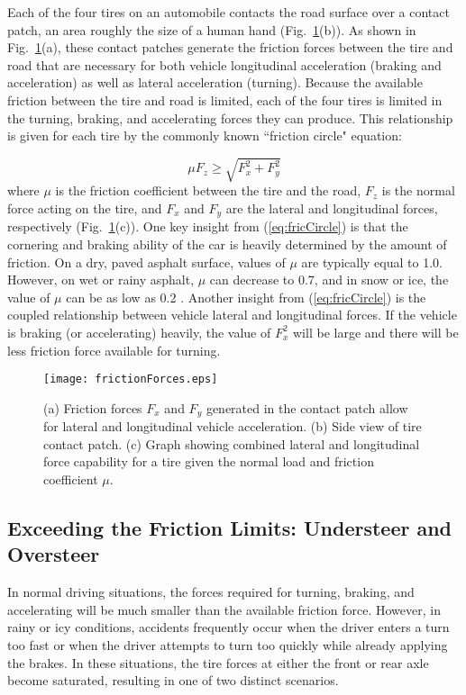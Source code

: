 Each of the four tires on an automobile contacts the road surface over a contact patch, an area roughly the size of a human hand (Fig.~\ref{fig:basicPhysics}(b)). 
As shown in Fig.~\ref{fig:basicPhysics}(a), these contact patches generate the friction forces between the tire and road that are necessary for both vehicle longitudinal acceleration (braking and acceleration)
as well as lateral acceleration (turning). Because the available friction between the tire and road is limited, each of the four
tires is limited in the turning, braking, and accelerating forces they can produce. This relationship is given for each tire by the commonly known
``friction circle" equation: 

\begin{equation}
\mu F_z \geq \sqrt{F_x^2 + F_y^2}
\label{eq:fricCircle}
\end{equation}
where $\mu$ is the friction coefficient between the tire and the road, $F_z$ is the normal force acting on the tire, and $F_x$ and
$F_y$ are the lateral and longitudinal forces, respectively (Fig.~\ref{fig:basicPhysics}(c)). One key insight from (\ref{eq:fricCircle}) is that the cornering and
braking ability of the car is heavily determined by the amount of friction. On a dry, paved asphalt surface, values of $\mu$ are typically
equal to 1.0. However, on wet or rainy asphalt, $\mu$ can decrease to 0.7, and in snow or ice, the value of $\mu$ can be 
as low as 0.2 \cite{fricStudy}. Another insight from (\ref{eq:fricCircle}) is the coupled relationship between vehicle lateral and longitudinal forces. If the vehicle
is braking (or accelerating) heavily, the value of $F_x^2$ will be large and there will be less friction force available for turning. 

 \begin{figure}
\centering
\texttt{[image: frictionForces.eps]}
\caption[Driving at the limits]{(a) Friction forces $F_x$ and $F_y$ generated in the contact patch allow for lateral and longitudinal vehicle acceleration. (b)
Side view of tire contact patch. (c) Graph showing combined lateral and longitudinal force capability for a tire given the normal load
and friction coefficient $\mu$.}
\label{fig:basicPhysics}
\end{figure}

\subsection{Exceeding the Friction Limits: Understeer and \newline Oversteer}
\label{sec:osteerusteer}
In normal driving situations, the forces required for turning, braking, and accelerating will be much smaller than the
 available friction force. However, in rainy or icy conditions, accidents frequently occur when the driver enters a turn too fast
 or when the driver attempts to turn too quickly while already applying the brakes. In these situations, the tire forces at either the
 front or rear axle become saturated, resulting in one of two distinct scenarios. 

